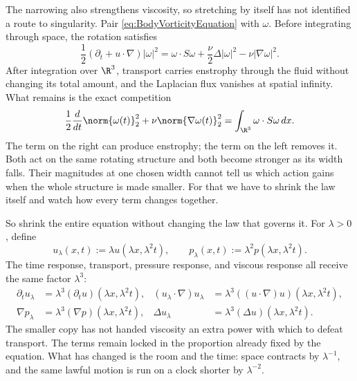 The narrowing also strengthens viscosity, so stretching by itself has not
identified a route to singularity.  Pair
\eqref{eq:BodyVorticityEquation} with \(\omega\).  Before integrating through
space, the rotation satisfies
\[
  \frac12(\partial_t+u\cdot\nabla)|\omega|^2
  =\omega\cdot S\omega
  +\frac\nu2\Delta|\omega|^2
  -\nu|\nabla\omega|^2.
\]
After integration over \(\R^3\), transport carries enstrophy through the fluid
without changing its total amount, and the Laplacian flux vanishes at spatial
infinity.  What remains is the exact competition
\begin{equation}\label{eq:BodyEnstrophyBalance}
  \frac12\frac d{dt}\norm{\omega(t)}_2^2
  +\nu\norm{\nabla\omega(t)}_2^2
  =\int_{\R^3}\omega\cdot S\omega\,dx.
\end{equation}
The term on the right can produce enstrophy; the term on the left removes it.
Both act on the same rotating structure and both become stronger as its width
falls.  Their magnitudes at one chosen width cannot tell us which action gains
when the whole structure is made smaller.  For that we have to shrink the law
itself and watch how every term changes together.

So shrink the entire equation without changing the law that governs it.  For
\(\lambda>0\), define
\begin{equation}\label{eq:BodyNavierStokesScaling}
  u_\lambda(x,t):=\lambda u(\lambda x,\lambda^2t),
  \qquad
  p_\lambda(x,t):=\lambda^2p(\lambda x,\lambda^2t).
\end{equation}
The time response, transport, pressure response, and viscous response all
receive the same factor \(\lambda^3\):
\[
\begin{aligned}
  \partial_tu_\lambda
  &=\lambda^3(\partial_tu)(\lambda x,\lambda^2t),
  &
  (u_\lambda\cdot\nabla)u_\lambda
  &=\lambda^3((u\cdot\nabla)u)(\lambda x,\lambda^2t),
  \\
  \nabla p_\lambda
  &=\lambda^3(\nabla p)(\lambda x,\lambda^2t),
  &
  \Delta u_\lambda
  &=\lambda^3(\Delta u)(\lambda x,\lambda^2t).
\end{aligned}
\]
The smaller copy has not handed viscosity an extra power with which to defeat
transport.  The terms remain locked in the proportion already fixed by the
equation.  What has changed is the room and the time: space contracts by
\(\lambda^{-1}\), and the same lawful motion is run on a clock shorter by
\(\lambda^{-2}\).


